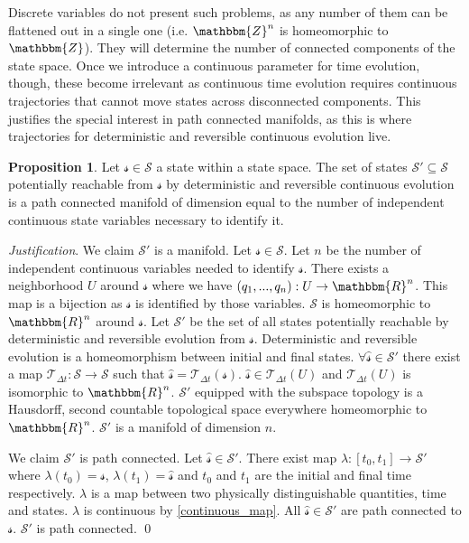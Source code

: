 \documentclass[aps,pra,10pt,twocolumn,floatfix,nofootinbib]{revtex4-1}
\numberwithin{equation}{section}
\theoremstyle{definition}
\newtheorem{prop}[equation]{Proposition}
\newenvironment{justification}{\emph{Justification}.}{\qed}
\begin{document}
Discrete variables do not present such problems, as any number of them can be flattened out in a single one (i.e. $\mathbbm{Z}^n$ is homeomorphic to $\mathbbm{Z}$). They will determine the number of connected components of the state space. Once we introduce a continuous parameter for time evolution, though, these become irrelevant as continuous time evolution requires continuous trajectories that cannot move states across disconnected components. This justifies the special interest in path connected manifolds, as this is where trajectories for deterministic and reversible continuous evolution live.

\begin{prop}\label{continuous_state_space}
	Let $\mathcal{s} \in \mathcal{S}$ a state within a state space. The set of states $\mathcal{S}'\subseteq\mathcal{S}$ potentially reachable from $\mathcal{s}$ by deterministic and reversible continuous evolution is a path connected manifold of dimension equal to the number of independent continuous state variables necessary to identify it.
\end{prop}

\begin{justification}
	We claim $\mathcal{S}'$ is a manifold. Let $\mathcal{s} \in \mathcal{S}$. Let $n$ be the number of independent continuous variables needed to identify $\mathcal{s}$. There exists a neighborhood $U$ around $\mathcal{s}$ where we have $(q_1,...,q_n):U\rightarrow \mathbbm{R}^n$. This map is a bijection as $\mathcal{s}$ is identified by those variables. $\mathcal{S}$ is homeomorphic to $\mathbbm{R}^n$ around  $\mathcal{s}$. Let $\mathcal{S}'$ be the set of all states potentially reachable by deterministic and reversible evolution from $\mathcal{s}$. Deterministic and reversible evolution is a homeomorphism between initial and final states. $\forall \hat{\mathcal{s}} \in \mathcal{S}'$ there exist a map $\mathcal{T}_{\Delta t}:\mathcal{S} \rightarrow \mathcal{S}$ such that $\hat{\mathcal{s}} =\mathcal{T}_{\Delta t}(\mathcal{s})$. $\hat{\mathcal{s}} \in \mathcal{T}_{\Delta t}(U)$ and $\mathcal{T}_{\Delta t}(U)$ is isomorphic to $\mathbbm{R}^n$. $\mathcal{S}'$ equipped with the subspace topology is a Hausdorff, second countable topological space everywhere homeomorphic to $\mathbbm{R}^n$. $\mathcal{S}'$ is a manifold of dimension $n$.
	
	We claim $\mathcal{S}'$ is path connected. Let $\hat{\mathcal{s}} \in \mathcal{S}'$. There exist map $\lambda : [t_0,t_1] \rightarrow \mathcal{S}'$ where $\lambda(t_0)=\mathcal{s}$, $\lambda(t_1)=\hat{\mathcal{s}}$ and $t_0$ and $t_1$ are the initial and final time respectively. $\lambda$ is a map between two physically distinguishable quantities, time and states. $\lambda$ is continuous by \ref{continuous_map}. All $\hat{\mathcal{s}} \in \mathcal{S}'$ are path connected to $\mathcal{s}$. $\mathcal{S}'$ is path connected.
\end{justification}
\end{document}
